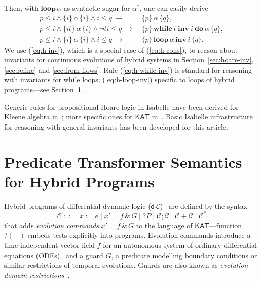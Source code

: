 \documentclass[envcountsame]{llncs}
\newcommand{\WHILEI}[3]{\mathbf{while}\ #1\ \mathbf{inv}\ #2\ \mathbf{do}\ #3}
\newcommand{\KAT}{\mathsf{KAT}}
\newcommand{\dL}{\mathsf{d}\mathcal{L}}
\newcommand\notein[3]{\todo[inline,linecolor=orange!80!black,backgroundcolor=#2!20]{#1: #3}%
}
\newcommand{\gin}[1]{\notein{{\bf GS}}{gcolor}{#1}}
\begin{document}
Then, with $\mathbf{loop}\, \alpha$ as syntactic sugar for
$\alpha^\ast$, one can easily derive
\begin{align}
  p\le i \land \{i\}\, \alpha\, \{i\}\land i\le q\ \rightarrow\
  &\{p\}\, \alpha\, \{q\},\label{eq:h-inv}\tag{h-inv}\\
  p \le i \wedge \{it\}\, \alpha\, \{i\} \wedge \neg t i\le q\
  \rightarrow \ & \{p\}\, \WHILEI{t}{i}{\alpha}\,  \{q\},\label{eq:h-while-inv}\tag{h-while-inv}\\
   p\le i \land \{i\}\, \alpha\, \{i\}\land i\le q\ \rightarrow\ &
                                                                   \{p\}\, \mathbf{loop}\, \alpha\,
    \mathbf{inv}\, i\, \{q\}. \label{eq:h-loop-inv}\tag{h-loop-inv}
\end{align}
We use (\ref{eq:h-inv}), which is a special case of (\ref{eq:h-cons}),
to reason about invariants for continuous evolutions of
hybrid systems in Section~\ref{sec:hoare-inv}, \ref{sec:refine} and
\ref{sec:from-flows}. Rule (\ref{eq:h-while-inv}) is standard for
reasoning with invariants for while loops; (\ref{eq:h-loop-inv})
specific to loops of hybrid programs---see
Section~\ref{sec:sta-hybrid}.

Generic rules for propositional Hoare logic in Isabelle have been
derived for Kleene algebra in~\cite{afp:ka}; more specific ones for
$\KAT$ in~\cite{afp:kat,afp:vericomp}. Basic Isabelle infrastructure for
reasoning with general invariants has been developed for this
article. 



\section{Predicate Transformer Semantics for Hybrid
  Programs}\label{sec:sta-hybrid}

\gin{Simon: add some paras on lenses.}

Hybrid programs of differential dynamic logic ($\dL$)~\cite{Platzer10}
are defined by the syntax
\begin{equation*}
\mathcal{C}\ ::= \ x:=e \mid x' = f \, \&\, G \mid ?P\mid \mathcal{C};\mathcal{C}\mid \mathcal{C}+\mathcal{C}\mid \mathcal{C}^*
\end{equation*}
that adds \emph{evolution commands} $x' = f \, \&\, G$ to the language
of $\KAT$---function $?(-)$ embeds tests explicitly into programs.
Evolution commands introduce a time independent vector field $f$ for
an autonomous system of ordinary differential equations
(ODEs)~\cite{Hirsch09,Teschl12} and a guard $G$, a predicate modelling
boundary conditions or similar restrictions of temporal
evolutions. Guards are also known as \emph{evolution domain
  restrictions}~\cite{DoyenFPP18}.
\end{document}
